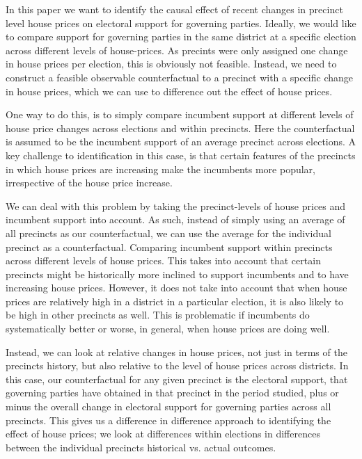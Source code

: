 \documentclass[12pt,a4paper]{article}
\begin{document}
In this paper we want to identify the causal effect of recent changes in precinct level house prices on electoral support for governing parties. Ideally, we would like to compare support for governing parties in the same district at a specific election across different levels of house-prices. As precints were only assigned one change in house prices per election, this is obviously not feasible. Instead, we need to construct a feasible observable counterfactual to a precinct with a specific change in house prices, which we can use to difference out the effect of house prices. 

One way to do this, is to simply compare incumbent support at different levels of house price changes across elections and within precincts. Here the counterfactual is assumed to be the incumbent support of an average precinct across elections. A key challenge to identification in this case, is that certain features of the precincts in which house prices are increasing make the incumbents more popular, irrespective of the house price increase. 

We can deal with this problem by taking the precinct-levels of house prices and incumbent support into account. As such, instead of simply using an average of all precincts as our counterfactual, we can use the average for the individual precinct as a counterfactual. Comparing incumbent support within precincts across different levels of house prices. This takes into account that certain precincts might be historically more inclined to support incumbents and to have increasing house prices. However, it does not take into account that when house prices are relatively high in a district in a particular election, it is also likely to be high in other precincts as well. This is problematic if incumbents do systematically better or worse, in general, when house prices are doing well.

Instead, we can look at relative changes in house prices, not just in terms of the precincts history, but also relative to the level of house prices across districts. In this case, our counterfactual for any given precinct is the electoral support, that governing parties have obtained in that precinct in the period studied, plus or minus the overall change in electoral support for governing parties across all precincts. This gives us a difference in difference approach to identifying the effect of house prices; we look at differences within elections in differences between the individual precincts historical vs. actual outcomes.
\end{document}
